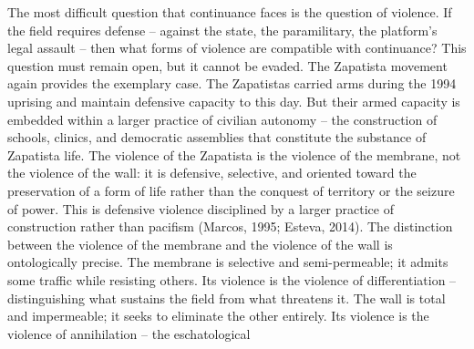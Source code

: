 The most difficult question that continuance faces is the question of violence. If the field requires defense – against the state, the paramilitary, the platform’s legal assault – then what forms of violence are compatible with continuance? This question must remain open, but it cannot be evaded. The Zapatista movement again provides the exemplary case. The Zapatistas carried arms during the 1994 uprising and maintain defensive capacity to this day. But their armed capacity is embedded within a larger practice of civilian autonomy – the construction of schools, clinics, and democratic assemblies that constitute the substance of Zapatista life. The violence of the Zapatista is the violence of the membrane, not the violence of the wall: it is defensive, selective, and oriented toward the preservation of a form of life rather than the conquest of territory or the seizure of power. This is defensive violence disciplined by a larger practice of construction rather than pacifism (Marcos, 1995; Esteva, 2014). The distinction between the violence of the membrane and the violence of the wall is ontologically precise. The membrane is selective and semi-permeable; it admits some traffic while resisting others. Its violence is the violence of differentiation – distinguishing what sustains the field from what threatens it. The wall is total and impermeable; it seeks to eliminate the other entirely. Its violence is the violence of annihilation – the eschatological

